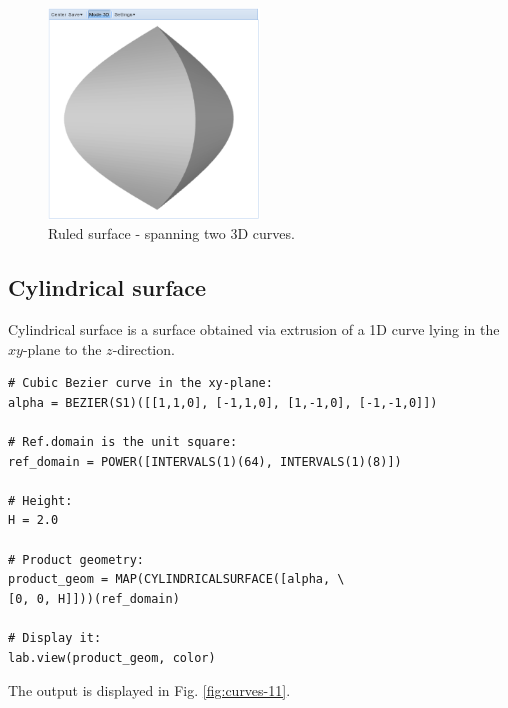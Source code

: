 \documentclass{article}
\begin{document}
\newpage

\begin{figure}[!ht]
\begin{center}
\includegraphics[width=0.5\textwidth]{img/curves-10.png}
\end{center}
\vspace{-2mm}
\caption{Ruled surface - spanning two 3D curves.}
\label{fig:curves-10}
\end{figure}


\subsection{Cylindrical surface}

Cylindrical surface is a surface obtained via extrusion of a 1D curve 
lying in the $xy$-plane to the $z$-direction.

\begin{verbatim}
# Cubic Bezier curve in the xy-plane:
alpha = BEZIER(S1)([[1,1,0], [-1,1,0], [1,-1,0], [-1,-1,0]])

# Ref.domain is the unit square:
ref_domain = POWER([INTERVALS(1)(64), INTERVALS(1)(8)])

# Height:
H = 2.0

# Product geometry:
product_geom = MAP(CYLINDRICALSURFACE([alpha, \
[0, 0, H]]))(ref_domain)

# Display it:
lab.view(product_geom, color)
\end{verbatim}
The output is displayed in Fig. \ref{fig:curves-11}.
\end{document}
